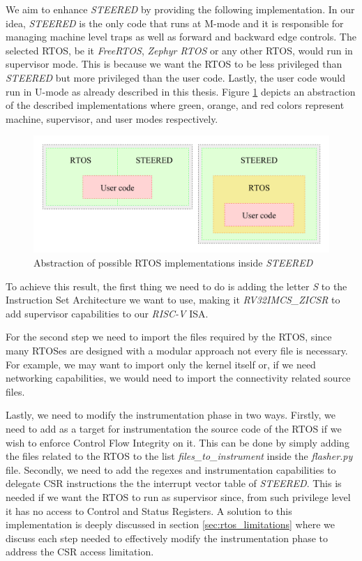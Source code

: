 We aim to enhance \textit{STEERED} by providing the following implementation. In
our idea, \textit{STEERED} is the only code that runs at M-mode and it is responsible
for managing machine level traps as well as forward and backward edge controls.
The selected RTOS, be it \textit{FreeRTOS}, \textit{Zephyr RTOS} or any other
RTOS, would run in supervisor mode. This is because we want the RTOS to be less
privileged than \textit{STEERED} but more privileged than the user code. Lastly,
the user code would run in U-mode as already described in this thesis. Figure
\ref{fig:rtos} depicts an abstraction of the described implementations where
green, orange, and red colors represent machine, supervisor, and user modes
respectively. \\
\begin{figure}[htbp]
  \centering
  \includegraphics[width=\linewidth]{images/rtos.png}
  \caption{Abstraction of possible RTOS implementations inside \textit{STEERED}}
  \label{fig:rtos}
\end{figure}

To achieve this result, the first thing we need to do is adding the letter \textit{S}
to the Instruction Set Architecture we want to use, making it \textit{RV32IMCS\_ZICSR}
to add supervisor capabilities to our \textit{RISC-V} ISA.

For the second step we need to import the files required by the RTOS, since many
RTOSes are designed with a modular approach not every file is necessary. For example,
we may want to import only the kernel itself or, if we need networking capabilities,
we would need to import the connectivity related source files.

Lastly, we need to modify the instrumentation phase in two ways. Firstly, we need
to add as a target for instrumentation the source code of the RTOS if we wish to
enforce Control Flow Integrity on it. This can be done by simply adding the
files related to the RTOS to the list \textit{files\_to\_instrument} inside the \textit{flasher.py}
file. Secondly, we need to add the regexes and instrumentation capabilities to
delegate CSR instructions the the interrupt vector table of \textit{STEERED}.
This is needed if we want the RTOS to run as supervisor since, from such privilege
level it has no access to Control and Status Registers. A solution to this
implementation is deeply discussed in section \ref{sec:rtos_limitations} where
we discuss each step needed to effectively modify the instrumentation phase to
address the CSR access limitation.

